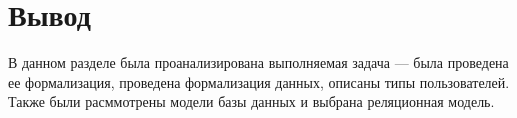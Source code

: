 




\section{Вывод}

В данном разделе была проанализирована выполняемая задача --- была проведена ее формализация, проведена формализация данных, описаны типы пользователей. Также были расммотрены модели базы данных и выбрана реляционная модель.
